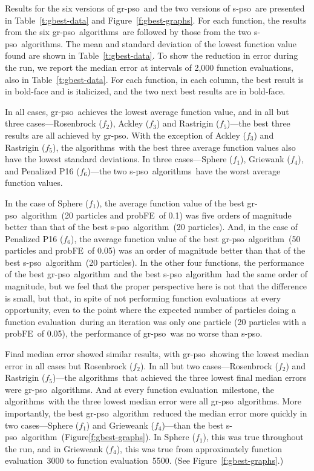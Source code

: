 \documentclass[a4paper,twoside]{article}
\newcommand{\fncevals}{function evaluations}
\newcommand{\fe}{function evaluation}
\newcommand{\fes}{function evaluations}
\newcommand{\pfe}{{probFE}}
\newcommand{\spso}{{\sc s-pso}}
\newcommand{\cfe}{{\sc gr-pso}}
\newcommand{\alg}{algorithm}
\newcommand{\algs}{algorithms}
\begin{document}
Results for the six versions of \cfe\ and the two versions of \spso\ are presented in Table~\ref{t:gbest-data} and Figure~\ref{f:gbest-graphs}.  For each function, the results from the six \cfe\ \algs\ are followed by those from the two \spso\ \algs. The mean and standard deviation of the lowest function value found are shown in Table~\ref{t:gbest-data}.  To show the reduction in error during the run, we report the median error  at intervals of 2,000 \fes, also in Table~\ref{t:gbest-data}.  For each function, in each column, the best result is in bold-face and is italicized, and the two next best results are in bold-face. 

In all cases, \cfe\ achieves the lowest average function value, and in all but three cases---Rosenbrock ($f_2$), Ackley ($f_3$) and Rastrigin ($f_5$)---the best three results are all achieved by \cfe.  With the exception of Ackley ($f_3$) and Rastrigin ($f_5$), the \algs\ with the best three average function values also have the lowest standard deviations. In three cases---Sphere ($f_1$), Griewank ($f_4$), and Penalized  P16 ($f_6$)---the two \spso\ \algs\ have the worst average function values. 

In the case of Sphere ($f_1$), the average function value of the best \cfe\ \alg\ (20 particles and \pfe\ of 0.1) was five orders of magnitude better than that of the best \spso\ \alg\ (20 particles).  And, in the case of Penalized P16 ($f_6$), the average function value of the best \cfe\ \alg\ (50 particles and \pfe\ of 0.05) was an order of magnitude better than that of the best \spso\ \alg\ (20 particles). In the other four functions, the performance of the best \cfe\ \alg\ and the best \spso\ \alg\ had the same order of magnitude, but we feel that the proper perspective here is not that the difference is small, but that, in spite of not performing \fncevals\ at every opportunity,
even to the point where the expected number of particles doing a \fe\ during an iteration was only one particle (20 particles with a \pfe\ of 0.05), the performance of \cfe\ was no worse than \spso.

Final median error showed similar results, with \cfe\ showing the lowest median error in all cases but  Rosenbrock  ($f_2$).  In all but two cases---Rosenbrock  ($f_2$) and  Rastrigin  ($f_5$)---the \algs\ that achieved the three lowest final median errors were \cfe\ \algs.  And at every \fe\ milestone, the \algs\ with the three lowest median error were all \cfe\ \algs.  More importantly, the best \cfe\ \alg\ reduced the median error more quickly in two cases---Sphere  ($f_1$) and  Grieweank  ($f_4$)---than the best \spso\ \alg\ (Figure\ref{f:gbest-graphs}).  In  Sphere  ($f_1$), this was true throughout the run, and in  Grieweank  ($f_4$), this was true from approximately \fe\ 3000 to \fe\ 5500. (See Figure~\ref{f:gbest-graphs}.)
\end{document}

